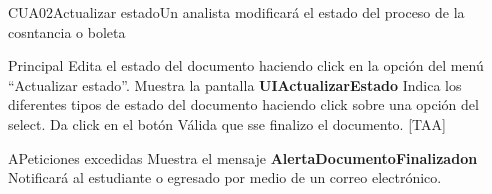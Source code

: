 \begin{UseCase}{CUA02}{Actualizar estado}{Un analista modificará el estado del proceso de la cosntancia o boleta}
{  }
\end{UseCase}

\begin{UCtrayectoria}{Principal}
  \UCpaso[\UCactor] Edita el estado del documento  haciendo click en la opción del menú ``Actualizar estado”.
  \UCpaso Muestra la pantalla  {\bf UIActualizarEstado}
  \UCpaso[\UCactor] Indica los diferentes  tipos de estado del documento haciendo click sobre una opción del select.
  \UCpaso[\UCactor] Da click en el botón 
  \UCpaso  Válida que sse finalizo el documento. [TAA] 
\end{UCtrayectoria} 

\begin{UCtrayectoriaA}{A}{Peticiones excedidas} 
\UCpaso Muestra el mensaje {\bf AlertaDocumentoFinalizadon}
  \UCpaso Notificará al estudiante o egresado por medio de un correo electrónico. 	
\end{UCtrayectoriaA}
